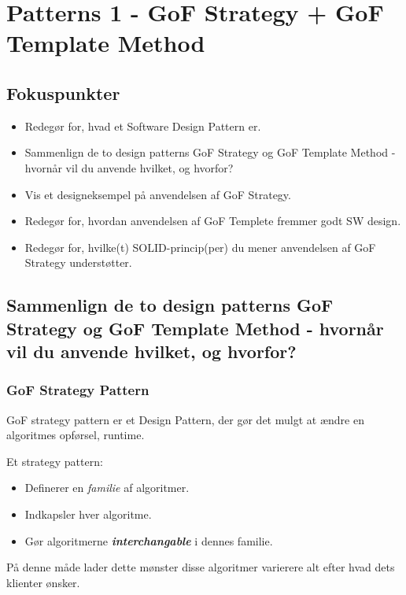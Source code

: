 \section{Patterns 1 - GoF Strategy + GoF Template Method}

\subsection{Fokuspunkter}

\begin{itemize}
	\item Redegør for, hvad et Software Design Pattern er.
	\item Sammenlign de to design patterns GoF Strategy og GoF Template Method - hvornår vil du anvende hvilket, og hvorfor?
	\item Vis et designeksempel på anvendelsen af GoF Strategy.
	\item Redegør for, hvordan anvendelsen af GoF Templete fremmer godt SW design.
	\item Redegør for, hvilke(t) SOLID-princip(per) du mener anvendelsen af GoF Strategy understøtter.
\end{itemize}



\subsection{Sammenlign de to design patterns GoF Strategy og GoF Template Method - hvornår vil du anvende hvilket, og hvorfor?}
\subsubsection{GoF Strategy Pattern}
GoF strategy pattern er et Design Pattern, der gør det mulgt at ændre en algoritmes opførsel, runtime.

Et strategy pattern:

\begin{itemize}
	\item Definerer en \textit{familie} af algoritmer.
	\item Indkapsler hver algoritme. 
	\item Gør algoritmerne \textbf{\textit{interchangable}} i dennes familie.
\end{itemize}

På denne måde lader dette mønster disse algoritmer varierere alt efter hvad dets klienter ønsker.


